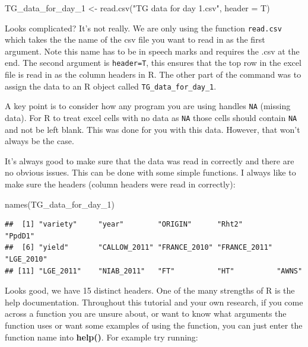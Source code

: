 \documentclass[
]{book}
\newenvironment{Shaded}{\begin{snugshade}}{\end{snugshade}}
\newcommand{\AttributeTok}[1]{\textcolor[rgb]{0.77,0.63,0.00}{#1}}
\newcommand{\FunctionTok}[1]{\textcolor[rgb]{0.00,0.00,0.00}{#1}}
\newcommand{\NormalTok}[1]{#1}
\newcommand{\OtherTok}[1]{\textcolor[rgb]{0.56,0.35,0.01}{#1}}
\newcommand{\StringTok}[1]{\textcolor[rgb]{0.31,0.60,0.02}{#1}}
\begin{document}
\begin{Shaded}
\begin{Highlighting}[]
\NormalTok{TG\_data\_for\_day\_1 }\OtherTok{\textless{}{-}} \FunctionTok{read.csv}\NormalTok{(}\StringTok{"TG data for day 1.csv"}\NormalTok{, }\AttributeTok{header =}\NormalTok{ T)}
\end{Highlighting}
\end{Shaded}

Looks complicated? It's not really. We are only using the function \texttt{read.csv} which takes the the name of the csv file you want to read in as the first argument. Note this name has to be in speech marks and requires the .csv at the end. The second argument is \texttt{header=T}, this ensures that the top row in the excel file is read in as the column headers in R. The other part of the command was to assign the data to an R object called \texttt{TG\_data\_for\_day\_1}.

A key point is to consider how any program you are using handles \texttt{NA} (missing data). For R to treat excel cells with no data as \texttt{NA} those cells should contain \texttt{NA} and not be left blank. This was done for you with this data. However, that won't always be the case.

It's always good to make sure that the data was read in correctly and there are no obvious issues. This can be done with some simple functions. I always like to make sure the headers (column headers were read in correctly):

\begin{Shaded}
\begin{Highlighting}[]
\FunctionTok{names}\NormalTok{(TG\_data\_for\_day\_1)}
\end{Highlighting}
\end{Shaded}

\begin{verbatim}
##  [1] "variety"     "year"        "ORIGIN"      "Rht2"        "PpdD1"      
##  [6] "yield"       "CALLOW_2011" "FRANCE_2010" "FRANCE_2011" "LGE_2010"   
## [11] "LGE_2011"    "NIAB_2011"   "FT"          "HT"          "AWNS"
\end{verbatim}

Looks good, we have 15 distinct headers. One of the many strengths of R is the help documentation. Throughout this tutorial and your own research, if you come across a function you are unsure about, or want to know what arguments the function uses or want some examples of using the function, you can just enter the function name into \textbf{help()}. For example try running:
\end{document}
